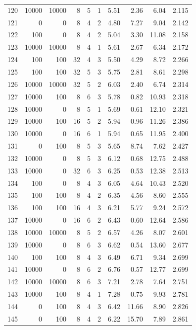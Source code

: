 \begin{footnotesize}
\begin{longtable}{@{}rrrrrrrrrr@{}}
120 & 10000 & 10000 & 8 & 5 & 1 & 5.51 & 2.36 & 6.04 & 2.115 \\
121 & 0 & 0 & 8 & 4 & 2 & 4.80 & 7.27 & 9.04 & 2.142 \\
122 & 100 & 0 & 8 & 4 & 2 & 5.04 & 3.30 & 11.08 & 2.158 \\
123 & 10000 & 10000 & 8 & 4 & 1 & 5.61 & 2.67 & 6.34 & 2.172 \\
124 & 100 & 100 & 32 & 4 & 3 & 5.50 & 4.29 & 8.72 & 2.266 \\
125 & 100 & 100 & 32 & 5 & 3 & 5.75 & 2.81 & 8.61 & 2.298 \\
126 & 10000 & 10000 & 32 & 5 & 2 & 6.03 & 2.40 & 6.74 & 2.314 \\
127 & 10000 & 100 & 8 & 6 & 3 & 5.78 & 0.82 & 10.93 & 2.318 \\
128 & 10000 & 0 & 8 & 5 & 1 & 5.69 & 0.61 & 12.10 & 2.321 \\
129 & 10000 & 100 & 16 & 5 & 2 & 5.94 & 0.96 & 11.26 & 2.386 \\
130 & 10000 & 0 & 16 & 6 & 1 & 5.94 & 0.65 & 11.95 & 2.400 \\
131 & 0 & 100 & 8 & 5 & 3 & 5.65 & 8.74 & 7.62 & 2.427 \\
132 & 10000 & 0 & 8 & 5 & 3 & 6.12 & 0.68 & 12.75 & 2.488 \\
133 & 10000 & 0 & 32 & 6 & 3 & 6.25 & 0.53 & 12.38 & 2.513 \\
134 & 100 & 0 & 8 & 4 & 3 & 6.05 & 4.64 & 10.43 & 2.520 \\
135 & 100 & 100 & 8 & 4 & 2 & 6.35 & 4.56 & 8.60 & 2.555 \\
136 & 100 & 100 & 16 & 4 & 3 & 6.21 & 5.77 & 9.24 & 2.572 \\
137 & 10000 & 0 & 16 & 6 & 2 & 6.43 & 0.60 & 12.64 & 2.586 \\
138 & 10000 & 10000 & 8 & 5 & 2 & 6.57 & 4.26 & 8.07 & 2.601 \\
139 & 10000 & 0 & 8 & 6 & 3 & 6.62 & 0.54 & 13.60 & 2.677 \\
140 & 100 & 100 & 8 & 4 & 3 & 6.49 & 6.71 & 9.34 & 2.699 \\
141 & 10000 & 0 & 8 & 6 & 2 & 6.76 & 0.57 & 12.77 & 2.699 \\
142 & 10000 & 10000 & 8 & 6 & 3 & 7.21 & 2.78 & 7.64 & 2.751 \\
143 & 10000 & 100 & 8 & 4 & 1 & 7.28 & 0.75 & 9.93 & 2.781 \\
144 & 0 & 100 & 8 & 4 & 3 & 6.42 & 11.66 & 8.90 & 2.826 \\
145 & 0 & 100 & 8 & 4 & 2 & 6.22 & 15.70 & 7.89 & 2.861 \\

\end{longtable}
\end{footnotesize}

